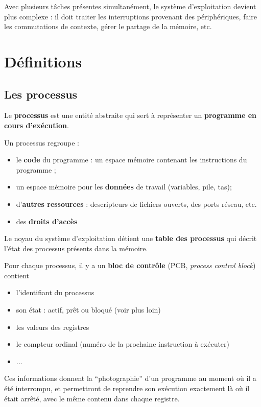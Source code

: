 \begin{multicols}{2}
Avec plusieurs tâches présentes simultanément, le système
d'exploitation devient plus complexe : il doit traiter les
interruptions provenant des périphériques, faire les commutations de
contexte, gérer le partage de la mémoire, etc.



 
\section{Définitions}
\subsection{Les processus}

Le \textbf{processus} est une entité abstraite qui sert à représenter
    un \textbf{programme en cours d'exécution}.

Un processus regroupe :
    \begin{itemize}
      \item le \textbf{code} du programme : un espace mémoire contenant les instructions
        du programme ;
      \item un espace mémoire pour les \textbf{données} de travail (variables, pile, tas);
      \item  d'\textbf{autres ressources} :
      descripteurs de fichiers ouverts, des ports réseau, etc.
    \item des \textbf{droits d'accès}
    \end{itemize}


Le noyau du système d'exploitation détient une \textbf{table des
  processus} qui décrit l'état des processus présents dans la mémoire.
 
Pour chaque processus, il y a un  \textbf{bloc de
  contrôle} (PCB, \emph{process control block})
  contient \begin{itemize}
\item l'identifiant du processus
\item son état : actif, prêt ou bloqué (voir plus loin)
\item les valeurs des registres
\item le compteur ordinal (numéro de la prochaine instruction à exécuter)
\item ...
\end{itemize}

Ces informations donnent la ``photographie'' d'un programme au moment
où il a été interrompu, et permettront de reprendre son exécution
exactement là où il était arrêté, avec le même contenu dans chaque
registre.



\end{multicols}
